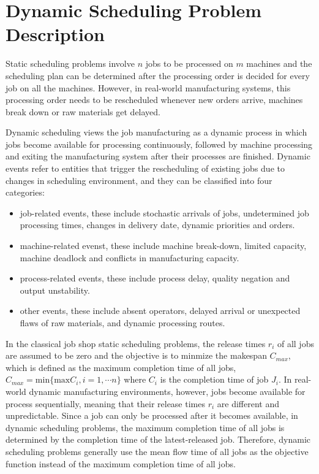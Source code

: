 \section{Dynamic Scheduling Problem Description}
Static scheduling problems involve $n$ jobs to be processed on $m$ machines and the scheduling plan can be determined after the processing order is decided for every job on all the machines.
However, in real-world manufacturing systems, this processing order needs to be rescheduled whenever new orders arrive, machines break down or raw materials get delayed.

Dynamic scheduling views the job manufacturing as a dynamic process in which jobs become available for processing continuously, followed by machine processing and exiting the manufacturing system after their processes are finished.
Dynamic events refer to entities that trigger the rescheduling of existing jobs due to changes in scheduling environment, and they can be classified into four categories:
\begin{itemize}
	\item job-related events, these include stochastic arrivals of jobs, undetermined job processing times, changes in delivery date, dynamic priorities and orders.
	\item machine-related evenst, these include machine break-down, limited capacity, machine deadlock and conflicts in manufacturing capacity.
	\item process-related events, these include process delay, quality negation and output unstability.
	\item other events, these include absent operators, delayed arrival or unexpected flaws of raw materials, and dynamic processing routes.
\end{itemize}

In the classical job shop static scheduling problems, the release times $r_i$ of all jobs are assumed to be zero and the objective is to minmize the makespan $C_{max}$, which is defined as the maximum completion time of all jobs, $C_{max} = \text{min}\{\text{max} C_i, i = 1, \cdots n\}$ where $C_i$ is the completion time of job $J_i$.
In real-world dynamic manufacturing environments, however, jobs become available for process sequentially, meaning that their release times $r_i$ are different and unpredictable. 
Since a job can only be processed after it becomes available, in dynamic scheduling problems, the maximum completion time of all jobs is determined by the completion time of the latest-released job.
Therefore, dynamic scheduling problems generally use the mean flow time of all jobs as the objective function instead of the maximum completion time of all jobs.

